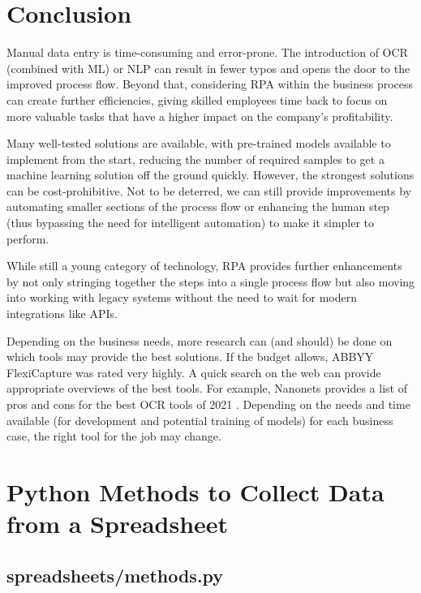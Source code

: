 \documentclass[conference]{IEEEtran}
\begin{document}
\section{Conclusion}
Manual data entry is time-consuming and error-prone. The introduction of OCR (combined with ML) or NLP can result in fewer typos and opens the door to the improved process flow. Beyond that, considering RPA within the business process can create further efficiencies, giving skilled employees time back to focus on more valuable tasks that have a higher impact on the company's profitability.

Many well-tested solutions are available, with pre-trained models available to implement from the start, reducing the number of required samples to get a machine learning solution off the ground quickly. However, the strongest solutions can be cost-prohibitive. Not to be deterred, we can still provide improvements by automating smaller sections of the process flow or enhancing the human step (thus bypassing the need for intelligent automation) to make it simpler to perform.

While still a young category of technology, RPA provides further enhancements by not only stringing together the steps into a single process flow but also moving into working with legacy systems without the need to wait for modern integrations like APIs.

Depending on the business needs, more research can (and should) be done on which tools may provide the best solutions. If the budget allows, ABBYY FlexiCapture was rated very highly. A quick search on the web can provide appropriate overviews of the best tools. For example, Nanonets provides a list of pros and cons for the best OCR tools of 2021 \cite{prithiv2021best}. Depending on the needs and time available (for development and potential training of models) for each business case, the right tool for the job may change.




\onecolumn
\appendices

\newpage
\section{Python Methods to Collect Data from a Spreadsheet} \label{appendixOrderOne}
    \subsection{spreadsheets/methods.py}
    
\end{document}
